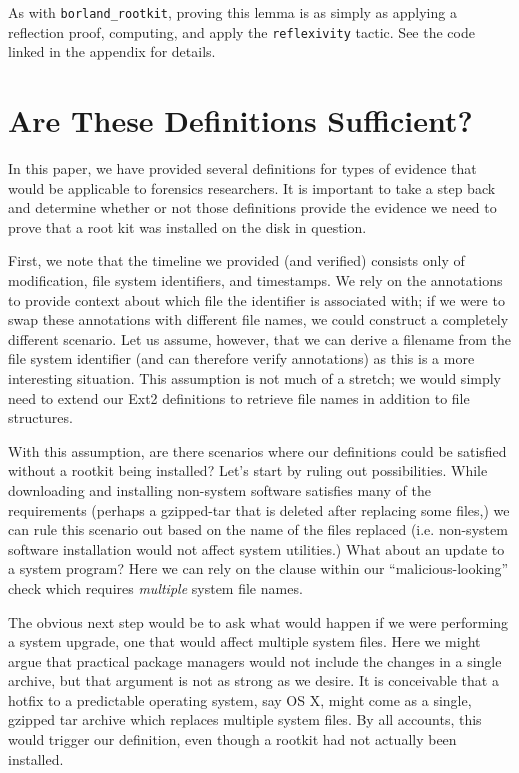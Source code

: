 \documentclass[nocopyrightspace,preprint]{sigplanconf}
\begin{document}
As with {\tt borland\_rootkit}, proving this lemma is as simply as applying a
reflection proof, computing, and apply the {\tt reflexivity} tactic. See the
code linked in the appendix for details.


\section{Are These Definitions Sufficient?}
\label{sec:sufficient}

In this paper, we have provided several definitions for types of evidence that
would be applicable to forensics researchers. It is important to take a step
back and determine whether or not those definitions provide the evidence we
need to prove that a root kit was installed on the disk in question. 

First, we note that the timeline we provided (and verified) consists only of
modification, file system identifiers, and timestamps. We rely on the
annotations to provide context about which file the identifier is associated
with; if we were to swap these annotations with different file names, we could
construct a completely different scenario. Let us assume, however, that we can
derive a filename from the file system identifier (and can therefore verify
annotations) as this is a more interesting situation. This assumption is not
much of a stretch; we would simply need to extend our Ext2 definitions to
retrieve file names in addition to file structures.

With this assumption, are there scenarios where our definitions could be
satisfied without a rootkit being installed? Let's start by ruling out
possibilities. While downloading and installing non-system software satisfies
many of the requirements (perhaps a gzipped-tar that is deleted after
replacing some files,) we can rule this scenario out based on the name of the
files replaced (i.e. non-system software installation would not affect system
utilities.) What about an update to a system program? Here we can rely on the
clause within our ``malicious-looking'' check which requires {\em multiple}
system file names.

The obvious next step would be to ask what would happen if we were performing
a system upgrade, one that would affect multiple system files. Here we might
argue that practical package managers would not include the changes in a
single archive, but that argument is not as strong as we desire. It is
conceivable that a hotfix to a predictable operating system, say OS X, might
come as a single, gzipped tar archive which replaces multiple system files. By
all accounts, this would trigger our definition, even though a rootkit had
not actually been installed.
\end{document}
